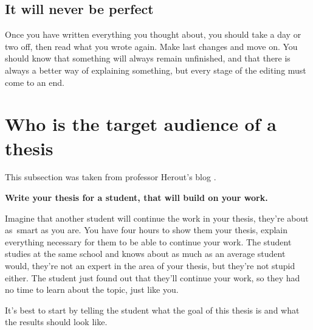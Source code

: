 \subsection*{It will never be perfect}
Once you have written everything you thought about, you should take a day or two off, then read what you wrote again. Make last changes and move on. You should know that something will always remain unfinished, and that there is always a better way of explaining something, but every stage of the editing must come to an end.

\section{Who is the target audience of a thesis}

This subsection was taken from professor Herout's blog \cite{Herout}.

\bigskip
\noindent \bf Write your thesis for a student, that will build on your work. \rm
\bigskip

Imagine that another student will continue the work in your thesis, they're about as~smart as you are. You have four hours to show them your thesis, explain everything necessary for them to be able to continue your work. The student studies at the same school and knows about as much as an average student would, they're not an expert in the area of your thesis, but they're not stupid either. The student just found out that they'll continue your work, so they had no time to learn about the topic, just like you.

It's best to start by telling the student what the goal of this thesis is and what the results should look like.

